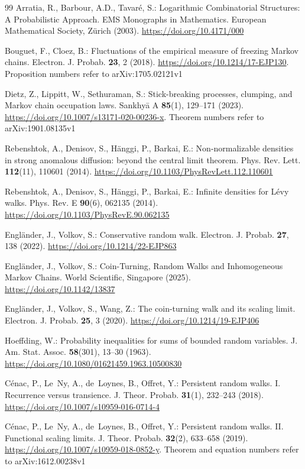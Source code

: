 \begin{thebibliography}{99}
Arratia, R., Barbour, A.D., Tavar\'e, S.: Logarithmic Combinatorial
Structures: A Probabilistic Approach. EMS Monographs in Mathematics. European
Mathematical Society, Z\"urich (2003). \url{https://doi.org/10.4171/000}

Bouguet, F., Cloez, B.: Fluctuations of the empirical measure of freezing
Markov chains. Electron. J. Probab. \textbf{23}, 2 (2018).
\url{https://doi.org/10.1214/17-EJP130}. Proposition numbers refer to
arXiv:1705.02121v1

Dietz, Z., Lippitt, W., Sethuraman, S.: Stick-breaking processes, clumping,
and Markov chain occupation laws. Sankhy\=a A \textbf{85}(1), 129--171
(2023). \url{https://doi.org/10.1007/s13171-020-00236-x}. Theorem numbers
refer to arXiv:1901.08135v1

Rebenshtok, A., Denisov, S., H\"anggi, P., Barkai, E.: Non-normalizable
densities in strong anomalous diffusion: beyond the central limit theorem.
Phys. Rev. Lett. \textbf{112}(11), 110601 (2014).
\url{https://doi.org/10.1103/PhysRevLett.112.110601}

Rebenshtok, A., Denisov, S., H\"anggi, P., Barkai, E.: Infinite densities for
L\'evy walks. Phys. Rev. E \textbf{90}(6), 062135 (2014).
\url{https://doi.org/10.1103/PhysRevE.90.062135}

Engl\"ander, J., Volkov, S.: Conservative random walk. Electron. J. Probab.
\textbf{27}, 138 (2022). \url{https://doi.org/10.1214/22-EJP863}

Engl\"ander, J., Volkov, S.: Coin-Turning, Random Walks and Inhomogeneous
Markov Chains. World Scientific, Singapore (2025).
\url{https://doi.org/10.1142/13837}

Engl\"ander, J., Volkov, S., Wang, Z.: The coin-turning walk and its scaling
limit. Electron. J. Probab. \textbf{25}, 3 (2020).
\url{https://doi.org/10.1214/19-EJP406}

Hoeffding, W.: Probability inequalities for sums of bounded random variables.
J. Am. Stat. Assoc. \textbf{58}(301), 13--30 (1963).
\url{https://doi.org/10.1080/01621459.1963.10500830}

C\'enac, P., Le~Ny, A., de~Loynes, B., Offret, Y.: Persistent random walks.
I. Recurrence versus transience. J. Theor. Probab. \textbf{31}(1), 232--243
(2018). \url{https://doi.org/10.1007/s10959-016-0714-4}

C\'enac, P., Le~Ny, A., de~Loynes, B., Offret, Y.: Persistent random walks.
II. Functional scaling limits. J. Theor. Probab. \textbf{32}(2), 633--658
(2019). \url{https://doi.org/10.1007/s10959-018-0852-y}. Theorem and
equation numbers refer to arXiv:1612.00238v1


\end{thebibliography}
